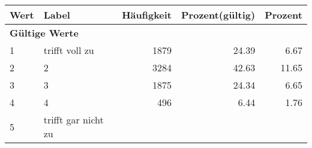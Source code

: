      \begin{longtable}{lXrrr}
     \toprule
     \textbf{Wert} & \textbf{Label} & \textbf{Häufigkeit} & \textbf{Prozent(gültig)} & \textbf{Prozent} \\
     \endhead
     \midrule
     \multicolumn{5}{l}{\textbf{Gültige Werte}}\\

     1 &
     \multicolumn{1}{X}{ trifft voll zu   } &


       \num{1879} &
       \num[round-mode=places,round-precision=2]{24.39} &
         \num[round-mode=places,round-precision=2]{6.67} \\

     2 &
     \multicolumn{1}{X}{ 2   } &


       \num{3284} &
       \num[round-mode=places,round-precision=2]{42.63} &
         \num[round-mode=places,round-precision=2]{11.65} \\

     3 &
     \multicolumn{1}{X}{ 3   } &


       \num{1875} &
       \num[round-mode=places,round-precision=2]{24.34} &
         \num[round-mode=places,round-precision=2]{6.65} \\

     4 &
     \multicolumn{1}{X}{ 4   } &


       \num{496} &
       \num[round-mode=places,round-precision=2]{6.44} &
         \num[round-mode=places,round-precision=2]{1.76} \\

     5 &
     \multicolumn{1}{X}{ trifft gar nicht zu   } &



\end{longtable}
